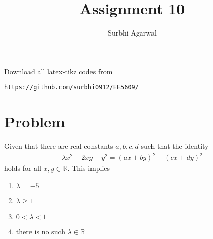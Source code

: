 \documentclass[journal,12pt,twocolumn]{IEEEtran}
\begin{document}
\let\StandardTheFigure\thefigure
\let\vec\mathbf

\renewcommand{\thefigure}{\theproblem}

\def\putbox#1#2#3{\makebox[0in][l]{\makebox[#1][l]{}\raisebox{\baselineskip}[0in][0in]{\raisebox{#2}[0in][0in]{#3}}}}
     \def\rightbox#1{\makebox[0in][r]{#1}}
     \def\centbox#1{\makebox[0in]{#1}}
     \def\topbox#1{\raisebox{-\baselineskip}[0in][0in]{#1}}
     \def\midbox#1{\raisebox{-0.5\baselineskip}[0in][0in]{#1}}
\vspace{3cm}

\title{Assignment 10}
\author{Surbhi Agarwal}

\maketitle

\newpage


\bigskip

\renewcommand{\thefigure}{\theenumi}
\renewcommand{\thetable}{\theenumi}

Download all latex-tikz codes from 
%
\begin{lstlisting}
https://github.com/surbhi0912/EE5609/
\end{lstlisting}
%
\section{Problem}
Given that there are real constants $a, b, c, d$ such that the identity
\begin{align}\label{nonumber}
    \lambda x^2 + 2xy + y^2 = (ax+by)^2 + (cx+dy)^2
\end{align}
holds for all $x, y \in \mathbb R$. This implies
\begin{enumerate}
    \item $\lambda = -5$
    \item $\lambda \geq 1$
    \item $0 < \lambda < 1$
    \item there is no such $\lambda \in \mathbb R$
\end{enumerate}
\end{document}

